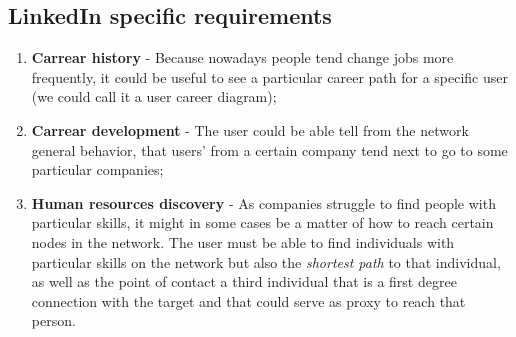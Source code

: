 \subsection{LinkedIn specific requirements}

\begin{enumerate}
    \item \textbf{Carrear history} - Because nowadays people tend change jobs more frequently, it could be useful to see a particular career path for a specific
    user (we could call it a user career diagram);
    \item \textbf{Carrear development} - The user could be able tell from the network general behavior, that users' from a certain company tend next to go to some particular companies;
    \item \textbf{Human resources discovery} - As companies struggle to find people with particular skills, it might in some cases be a matter of how to reach certain nodes in the network. The user must be able to find individuals with particular skills on the network but also the \textit{shortest path} to that individual, as well as the point of contact a third individual that is a first degree connection with the target and that could serve as proxy to reach that person.
\end{enumerate}
